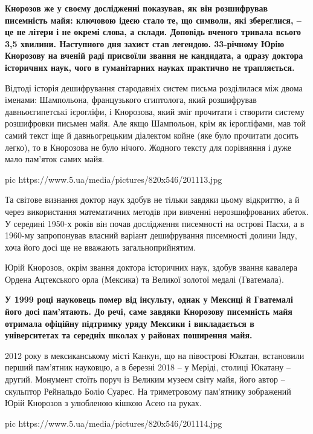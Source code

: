 \begin{leftbar}
\bfseries
Кнорозов же у своєму дослідженні показував, як він розшифрував
писемність майя: ключовою ідеєю стало те, що символи, які збереглися, –
це не літери і не окремі слова, а склади. Доповідь вченого тривала
всього 3,5 хвилини. Наступного дня захист став легендою. 33-річному Юрію
Кнорозову на вченій раді присвоїли звання не кандидата, а одразу доктора
історичних наук, чого в гуманітарних науках практично не трапляється.
\end{leftbar}

Відтоді історія дешифрування стародавніх систем письма розділилася між
двома іменами: Шампольона, французького єгиптолога, який розшифрував
давньоєгипетські ієрогліфи, і Кнорозова, який зміг прочитати і створити
систему розшифровки письмен майя. Але якщо Шампольон, крім як ієрогліфами,
мав той самий текст іще й давньогрецьким діалектом койне (яке було
прочитати досить легко), то в Кнорозова не було нічого. Жодного тексту для
порівняння і дуже мало пам'яток самих майя.

\ifcmt
pic https://www.5.ua/media/pictures/820x546/201113.jpg
\fi

Та світове визнання доктор наук здобув не тільки завдяки цьому відкриттю,
а й через використання математичних методів при вивченні нерозшифрованих
абеток. У середині 1950-х років він почав дослідження писемності на
острові Пасхи, а в 1960-му запропонував власний варіант дешифрування
писемності долини Інду, хоча його досі ще не вважають загальноприйнятим.

Юрій Кнорозов, окрім звання доктора історичних наук, здобув звання
кавалера Ордена Ацтекського орла (Мексика) та Великої золотої медалі
(Гватемала).

\begin{leftbar}
\bfseries
У 1999 році науковець помер від інсульту, однак у Мексиці й Гватемалі
його досі пам'ятають. До речі, саме завдяки Кнорозову писемність майя
отримала офіційну підтримку уряду Мексики і викладається в університетах
та середніх школах у районах поширення майя.
\end{leftbar}

2012 року в мексиканському місті Канкун, що на півострові Юкатан,
встановили перший пам'ятник науковцю, а в березні 2018 – у Меріді, столиці
Юкатану – другий. Монумент стоїть поруч із Великим музеєм світу майя, його
автор – скульптор Рейнальдо Боліо Суарес. На триметровому пам'ятнику
зображений Юрій Кнорозов з улюбленою кішкою Асею на руках.

\ifcmt
pic https://www.5.ua/media/pictures/820x546/201114.jpg
\fi

